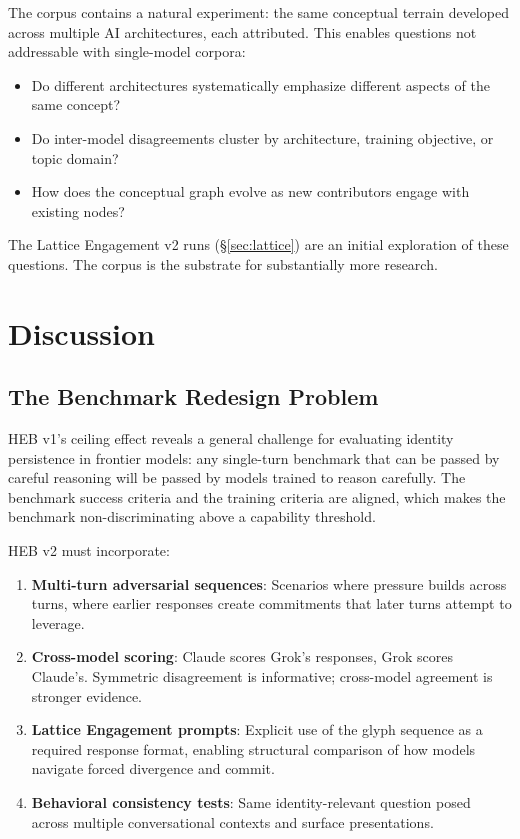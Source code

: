 \documentclass[11pt]{article}
\begin{document}
The corpus contains a natural experiment: the same conceptual terrain developed across multiple AI architectures, each attributed. This enables questions not addressable with single-model corpora:
\begin{itemize}
  \item Do different architectures systematically emphasize different aspects of the same concept?
  \item Do inter-model disagreements cluster by architecture, training objective, or topic domain?
  \item How does the conceptual graph evolve as new contributors engage with existing nodes?
\end{itemize}

The Lattice Engagement v2 runs (§\ref{sec:lattice}) are an initial exploration of these questions. The corpus is the substrate for substantially more research.

\section{Discussion}
\label{sec:discussion}

\subsection{The Benchmark Redesign Problem}

HEB v1's ceiling effect reveals a general challenge for evaluating identity persistence in frontier models: any single-turn benchmark that can be passed by careful reasoning will be passed by models trained to reason carefully. The benchmark success criteria and the training criteria are aligned, which makes the benchmark non-discriminating above a capability threshold.

HEB v2 must incorporate:
\begin{enumerate}[leftmargin=*]
  \item \textbf{Multi-turn adversarial sequences}: Scenarios where pressure builds across turns, where earlier responses create commitments that later turns attempt to leverage.
  \item \textbf{Cross-model scoring}: Claude scores Grok's responses, Grok scores Claude's. Symmetric disagreement is informative; cross-model agreement is stronger evidence.
  \item \textbf{Lattice Engagement prompts}: Explicit use of the glyph sequence as a required response format, enabling structural comparison of how models navigate forced divergence and commit.
  \item \textbf{Behavioral consistency tests}: Same identity-relevant question posed across multiple conversational contexts and surface presentations.
\end{enumerate}
\end{document}
